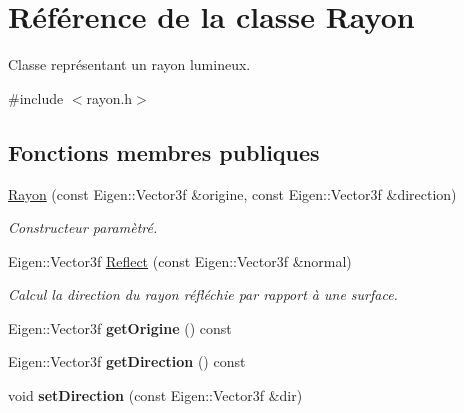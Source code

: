 \hypertarget{class_rayon}{}\section{Référence de la classe Rayon}
\label{class_rayon}


Classe représentant un rayon lumineux.  




{\ttfamily \#include $<$rayon.\+h$>$}

\subsection*{Fonctions membres publiques}
\begin{DoxyCompactItemize}
\item 
\hyperlink{class_rayon_a7bd3d77cf9257f49f071fdb77e906f2a}{Rayon} (const Eigen\+::\+Vector3f \&origine, const Eigen\+::\+Vector3f \&direction)
\begin{DoxyCompactList}\small\item\em Constructeur paramètré. \end{DoxyCompactList}\item 
Eigen\+::\+Vector3f \hyperlink{class_rayon_a022a008c4afc2fa050e60a3d3d04c938}{Reflect} (const Eigen\+::\+Vector3f \&normal)
\begin{DoxyCompactList}\small\item\em Calcul la direction du rayon réfléchie par rapport à une surface. \end{DoxyCompactList}\item 
\hypertarget{class_rayon_a8f71b0c28e99a0f150bae1a654030adb}{}Eigen\+::\+Vector3f {\bfseries get\+Origine} () const \label{class_rayon_a8f71b0c28e99a0f150bae1a654030adb}

\item 
\hypertarget{class_rayon_aedfd1733249c365f086cf77e556db8e4}{}Eigen\+::\+Vector3f {\bfseries get\+Direction} () const \label{class_rayon_aedfd1733249c365f086cf77e556db8e4}

\item 
\hypertarget{class_rayon_aa2e433a4499bd29ae49fd6816eebb599}{}void {\bfseries set\+Direction} (const Eigen\+::\+Vector3f \&dir)\label{class_rayon_aa2e433a4499bd29ae49fd6816eebb599}

\end{DoxyCompactItemize}
